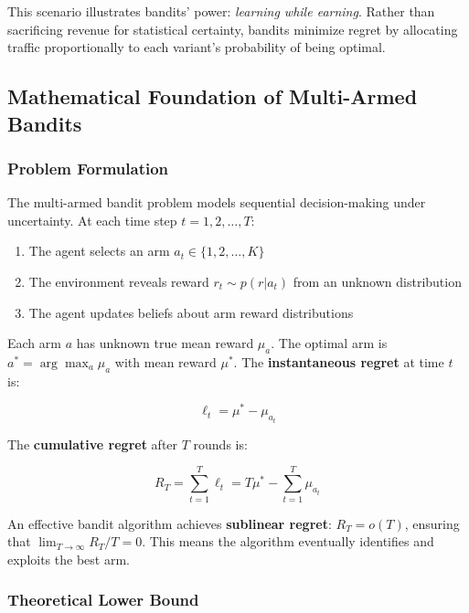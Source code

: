 This scenario illustrates bandits' power: \textit{learning while earning}. Rather than sacrificing revenue for statistical certainty, bandits minimize regret by allocating traffic proportionally to each variant's probability of being optimal.

\subsection{Mathematical Foundation of Multi-Armed Bandits}

\subsubsection{Problem Formulation}

The multi-armed bandit problem models sequential decision-making under uncertainty. At each time step $t = 1, 2, \ldots, T$:

\begin{enumerate}
    \item The agent selects an arm $a_t \in \{1, 2, \ldots, K\}$
    \item The environment reveals reward $r_t \sim p(r | a_t)$ from an unknown distribution
    \item The agent updates beliefs about arm reward distributions
\end{enumerate}

Each arm $a$ has unknown true mean reward $\mu_a$. The optimal arm is $a^* = \arg\max_a \mu_a$ with mean reward $\mu^*$. The \textbf{instantaneous regret} at time $t$ is:

\begin{equation}
\ell_t = \mu^* - \mu_{a_t}
\end{equation}

The \textbf{cumulative regret} after $T$ rounds is:

\begin{equation}
R_T = \sum_{t=1}^{T} \ell_t = T\mu^* - \sum_{t=1}^{T} \mu_{a_t}
\end{equation}

An effective bandit algorithm achieves \textbf{sublinear regret}: $R_T = o(T)$, ensuring that $\lim_{T \to \infty} R_T / T = 0$. This means the algorithm eventually identifies and exploits the best arm.

\subsubsection{Theoretical Lower Bound}


